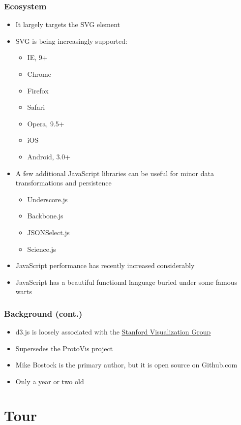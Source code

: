 \documentclass{beamer}
\begin{document}
\begin{frame}
\frametitle{Ecosystem}
\begin{itemize}
\item It largely targets the SVG element
\item SVG is being increasingly supported:
    \begin{itemize}
    \item IE, 9+
    \item Chrome
    \item Firefox
    \item Safari
    \item Opera, 9.5+
    \item iOS
    \item Android, 3.0+
    \end{itemize}
\item A few additional JavaScript libraries can be useful for minor data transformations and persistence
    \begin{itemize}
    \item Underscore.js
    \item Backbone.js
    \item JSONSelect.js 
    \item Science.js
    \end{itemize}
\item JavaScript performance has recently increased considerably
\item JavaScript has a beautiful functional language buried under some famous warts
\end{itemize}
\end{frame}



\begin{frame}
\frametitle{Background (cont.)}
\begin{itemize}
\item d3.js is loosely associated with the \href{http://vis.stanford.edu/}{\underline{Stanford Visualization Group}}
\item Supersedes the ProtoVis project
\item Mike Bostock is the primary author, but it is open source on Github.com
\item Only a year or two old
\end{itemize}
\end{frame}



\section{Tour}
\end{document}
